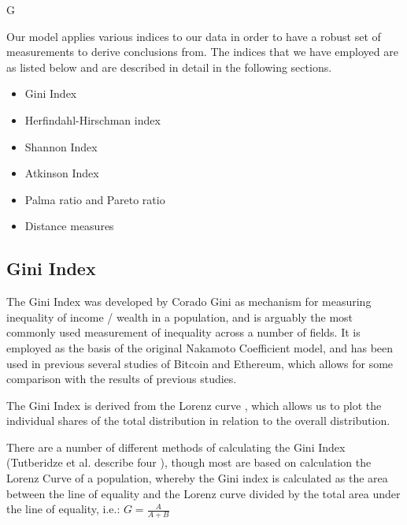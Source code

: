 G\documentclass[conference]{IEEEtran}
\begin{document}
Our model applies various indices to our data in order to have a robust set of measurements to derive conclusions from.  The indices that we have employed are as listed below and are described in detail in the following sections.

\begin{itemize}
    \item Gini Index
    \item Herfindahl-Hirschman index
    \item Shannon Index
    \item Atkinson Index
    \item Palma ratio and Pareto ratio
    \item Distance measures
\end{itemize}

\subsection{Gini Index}

The Gini Index was developed by Corado Gini \cite{gini1936measure} as mechanism for measuring inequality of income / wealth in a population, and is arguably the most commonly used measurement of inequality across a number of fields.   It is employed as the basis of the original Nakamoto Coefficient model, and has been used in previous \cite{sai2021characterizing, lee2021dq, gupta2018gini, kusmierz2022centralized, kwon2019impossibility, cong2023inclusion, gochhayat2020measuring, karakostas2022sok, zhang2022sok, campajola2022evolution} several studies of Bitcoin and Ethereum, which allows for some comparison with the results of previous studies.

The Gini Index is derived from the Lorenz curve \cite{lorenz1905methods}, which allows us to plot the individual shares of the total distribution in relation to the overall distribution.

There are a number of different methods of calculating the Gini Index (Tutberidze et al. describe four \cite{tutberidze2018measuring}), though most are based on calculation the Lorenz Curve of a population, whereby the  Gini index is calculated as the area between the line of equality and the Lorenz curve divided by the total area under the line of equality, i.e.: \(G=\frac{A}{A+B}\)

\end{document}
